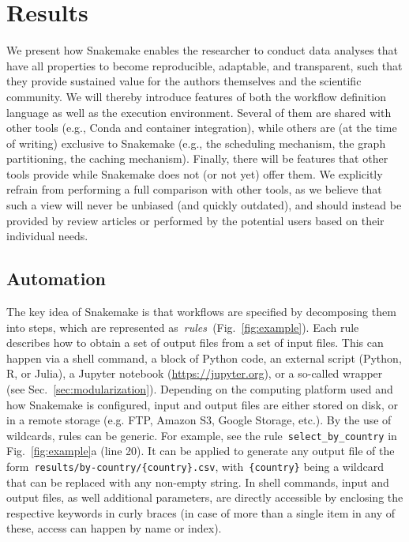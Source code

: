 \documentclass[parskip=half]{scrartcl}
\let\plainurl\url
\renewcommand{\url}[1]{\protect\plainurl{#1}}
\begin{document}
\section{Results}

We present how Snakemake enables the researcher to conduct data analyses that have all properties to become reproducible, adaptable, and transparent, such that they provide sustained value for the authors themselves and the scientific community.
We will thereby introduce features of both the workflow definition language as well as the execution environment.
Several of them are shared with other tools (e.g., Conda and container integration), while others are (at the time of writing) exclusive to Snakemake (e.g., the scheduling mechanism, the graph partitioning, the caching mechanism).
Finally, there will be features that other tools provide while Snakemake does not (or not yet) offer them.
We explicitly refrain from performing a full comparison with other tools, as we believe that such a view will never be unbiased (and quickly outdated), and should instead be provided by review articles or performed by the potential users based on their individual needs.

\subsection{Automation}\label{sec:automation}

The key idea of Snakemake is that workflows are specified by decomposing them into steps, which are represented as~\emph{rules~}(Fig.~\ref{fig:example}).
Each rule describes how to obtain a set of output files from a set of input files.
This can happen via a shell command, a block of Python code, an external script (Python, R, or Julia), a Jupyter notebook (\url{https://jupyter.org}), or a so-called wrapper (see Sec.~\ref{sec:modularization}).
Depending on the computing platform used and how Snakemake is configured, input and output files are either stored on disk, or in a remote storage (e.g. FTP, Amazon S3, Google Storage, etc.).
By the use of wildcards, rules can be generic.
For example, see the rule~\lstinline!select_by_country! in Fig.~\ref{fig:example}a (line 20).
It can be applied to generate any output file of the form~\lstinline!results/by-country/{country}.csv!, with~\lstinline!{country}! being a wildcard that can be replaced with any non-empty string.
In shell commands, input and output files, as well additional parameters, are directly accessible by enclosing the respective keywords in curly braces (in case of more than a single item in any of these, access can happen by name or index).
\end{document}
